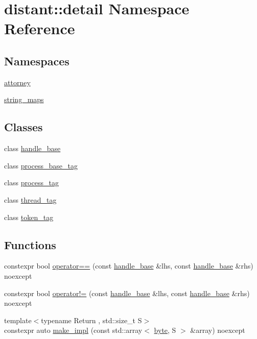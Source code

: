 \hypertarget{namespacedistant_1_1detail}{}\section{distant\+:\+:detail Namespace Reference}
\label{namespacedistant_1_1detail}
\subsection*{Namespaces}
\begin{DoxyCompactItemize}
\item 
 \mbox{\hyperlink{namespacedistant_1_1detail_1_1attorney}{attorney}}
\item 
 \mbox{\hyperlink{namespacedistant_1_1detail_1_1string__maps}{string\+\_\+maps}}
\end{DoxyCompactItemize}
\subsection*{Classes}
\begin{DoxyCompactItemize}
\item 
class \mbox{\hyperlink{classdistant_1_1detail_1_1handle__base}{handle\+\_\+base}}
\item 
class \mbox{\hyperlink{classdistant_1_1detail_1_1process__base__tag}{process\+\_\+base\+\_\+tag}}
\item 
class \mbox{\hyperlink{classdistant_1_1detail_1_1process__tag}{process\+\_\+tag}}
\item 
class \mbox{\hyperlink{classdistant_1_1detail_1_1thread__tag}{thread\+\_\+tag}}
\item 
class \mbox{\hyperlink{classdistant_1_1detail_1_1token__tag}{token\+\_\+tag}}
\end{DoxyCompactItemize}
\subsection*{Functions}
\begin{DoxyCompactItemize}
\item 
constexpr bool \mbox{\hyperlink{namespacedistant_1_1detail_aa460c2625dfa826f49513781c99514f8}{operator==}} (const \mbox{\hyperlink{classdistant_1_1detail_1_1handle__base}{handle\+\_\+base}} \&lhs, const \mbox{\hyperlink{classdistant_1_1detail_1_1handle__base}{handle\+\_\+base}} \&rhs) noexcept
\item 
constexpr bool \mbox{\hyperlink{namespacedistant_1_1detail_a2f6761ad9fb93f6989d37774e16e415c}{operator!=}} (const \mbox{\hyperlink{classdistant_1_1detail_1_1handle__base}{handle\+\_\+base}} \&lhs, const \mbox{\hyperlink{classdistant_1_1detail_1_1handle__base}{handle\+\_\+base}} \&rhs) noexcept
\item 
{\footnotesize template$<$typename Return , std\+::size\+\_\+t S$>$ }\\constexpr auto \mbox{\hyperlink{namespacedistant_1_1detail_a9eff3899795b40a419c24bc7f6b36785}{make\+\_\+impl}} (const std\+::array$<$ \mbox{\hyperlink{namespacedistant_af9c3f04a9b855a1368d6c1a9ce28c2f4}{byte}}, S $>$ \&array) noexcept
\end{DoxyCompactItemize}
